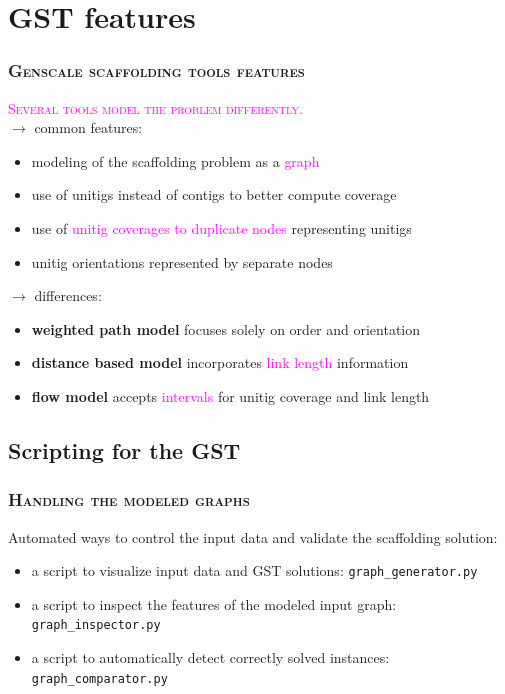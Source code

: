 \documentclass{beamer}
\begin{document}
\section{GST features}\label{GST}
\begin{frame}
\frametitle{\textsc{Genscale scaffolding tools features}}

\textsc{\textcolor{magenta}{Several tools model the problem differently.}}
\vspace*{0.5cm} \\
\footnotesize
$\to$ common features: 
\begin{itemize}
\item modeling of the scaffolding problem as a \textcolor{magenta}{graph}
\item use of unitigs instead of contigs to better compute coverage
\item use of \textcolor{magenta}{unitig coverages to duplicate nodes} representing unitigs
\item unitig orientations represented by separate nodes
\end{itemize}
$\to$ differences: 
\begin{itemize}
\item \textbf{weighted path model} focuses solely on order and orientation
\item \textbf{distance based model} incorporates \textcolor{magenta}{link length} information
\item \textbf{flow model} accepts \textcolor{magenta}{intervals} for unitig coverage and link length
\end{itemize}
\end{frame}

\subsection{Scripting for the GST}\label{scripting}
\begin{frame}
\frametitle{\textsc{Handling the modeled graphs}}
Automated ways to control the input data and validate the scaffolding solution:
\begin{itemize}
\item a script to visualize input data and GST solutions: \texttt{graph\_generator.py}
\item a script to inspect the features of the modeled input graph: \texttt{graph\_inspector.py}
\item a script to automatically detect correctly solved instances: \texttt{graph\_comparator.py}
\end{itemize}
\end{frame}
\end{document}
